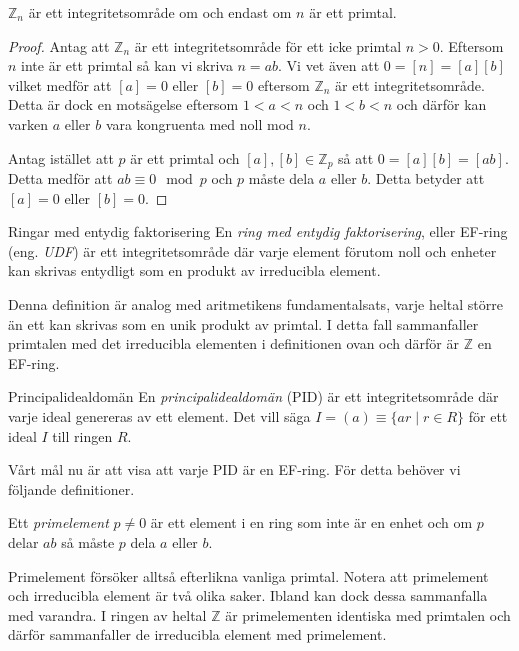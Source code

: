 \documentclass{article}
\theoremstyle{definition}
\begin{document}
\begin{mytheo}{}{}
  $\mathbb{Z}_n$ är ett integritetsområde om och endast om $n$ är ett primtal.
\end{mytheo}
\begin{proof}
  Antag att $\mathbb{Z}_n$ är ett integritetsområde för ett icke primtal $n > 0$. Eftersom $n$ inte är ett primtal så kan vi skriva 
  $n = ab$. Vi vet även att $0 = [n] = [a][b]$ vilket medför att $[a] = 0$ eller $[b] = 0$ eftersom $\mathbb{Z}_n$ är ett integritetsområde. 
  Detta är dock en motsägelse eftersom $1 < a < n$ och $1 < b < n$ och därför kan varken $a$ eller $b$ vara kongruenta med noll mod $n$. 

  Antag istället att $p$ är ett primtal och $[a], [b] \in \mathbb{Z}_p$ så att $0 = [a][b] = [ab]$. Detta medför att 
  $ab \equiv 0 \mod p$ och $p$ måste dela $a$ eller $b$. Detta betyder att $[a] = 0$ eller $[b] = 0$.
\end{proof}

\begin{mydef}{Ringar med entydig faktorisering}{}
  En \textit{ring med entydig faktorisering}, eller EF-ring (eng. \textit{UDF}) är ett integritetsområde där varje element förutom noll och enheter
  kan skrivas entydligt som en produkt av irreducibla element.
\end{mydef}

Denna definition är analog med aritmetikens fundamentalsats, varje heltal större än ett kan skrivas som en unik produkt av primtal. I detta fall sammanfaller 
primtalen med det irreducibla elementen i definitionen ovan och därför är $\mathbb{Z}$ en EF-ring.

\begin{mydef}{Principalidealdomän}{}
  En \textit{principalidealdomän} (PID) är ett integritetsområde där varje ideal genereras av ett element. 
  Det vill säga $I = (a) \equiv \{ar \; | \; r \in R\}$ för ett ideal $I$ till ringen $R$.
\end{mydef}

Vårt mål nu är att visa att varje PID är en EF-ring. För detta behöver vi följande definitioner. 

\begin{mydef}{}{}
  Ett \textit{primelement} $p \neq 0$ är ett element i en ring som inte är en enhet och om $p$ delar $ab$ så måste $p$ dela $a$ eller $b$.
\end{mydef}

Primelement försöker alltså efterlikna vanliga primtal. Notera att primelement och irreducibla element är två olika saker. Ibland kan dock dessa 
sammanfalla med varandra. 
I ringen av heltal $\mathbb{Z}$ är primelementen identiska med primtalen och därför sammanfaller 
de irreducibla element med primelement. 
\end{document}
